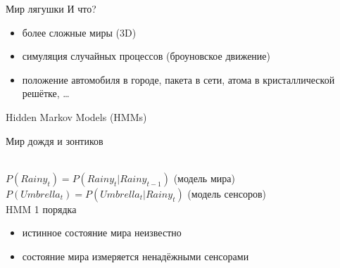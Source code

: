 \documentclass[10pt]{beamer}
\begin{document}
\begin{frame}{Мир лягушки}
  И что?
  \begin{itemize}
  \item более сложные миры (3D)
  \item симуляция случайных процессов (броуновское движение)
  \item положение автомобиля в городе, пакета в сети, атома в
    кристаллической решётке, …
  \end{itemize}
\end{frame}

\begin{frame}
  \begin{center}
    \Large
    Hidden Markov Models (HMMs)
  \end{center}
\end{frame}

\begin{frame}{Мир дождя и зонтиков}
  \begin{center}
  \\
  \vspace{1em}
  $P(Rainy_t)=P(Rainy_t|Rainy_{t-1})$ (модель мира)\\
  $P(Umbrella_t)=P(Umbrella_t|Rainy_t)$ (модель сенсоров)\\
  \vspace{1em}
  \Large
  HMM 1 порядка
  \end{center}
  \begin{itemize}
  \item истинное состояние мира неизвестно
  \item состояние мира измеряется ненадёжными сенсорами
  \end{itemize}
\end{frame}
\end{document}
